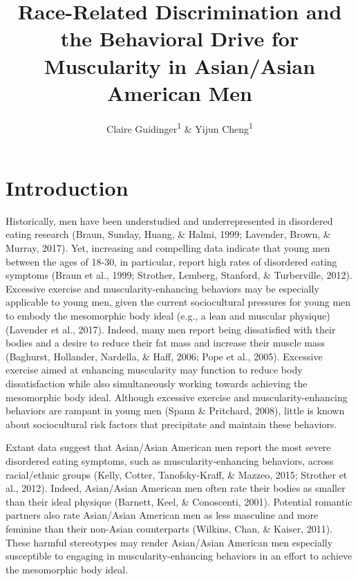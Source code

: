 \documentclass[
  english,
  man, fleqn, noextraspace,floatsintext]{apa6}
\title{Race-Related Discrimination and the Behavioral Drive for Muscularity in Asian/Asian American Men}
\author{Claire Guidinger\textsuperscript{1} \& Yijun Cheng\textsuperscript{1}}
\date{}
\affiliation{\vspace{0.5cm}\textsuperscript{1} University of Oregon}
\begin{document}
\maketitle

\hypertarget{introduction}{%
\section{Introduction}\label{introduction}}

Historically, men have been understudied and underrepresented in disordered eating research (Braun, Sunday, Huang, \& Halmi, 1999; Lavender, Brown, \& Murray, 2017). Yet, increasing and compelling data indicate that young men between the ages of 18-30, in particular, report high rates of disordered eating symptoms (Braun et al., 1999; Strother, Lemberg, Stanford, \& Turberville, 2012). Excessive exercise and muscularity-enhancing behaviors may be especially applicable to young men, given the current sociocultural pressures for young men to embody the mesomorphic body ideal (e.g., a lean and muscular physique) (Lavender et al., 2017). Indeed, many men report being dissatisfied with their bodies and a desire to reduce their fat mass and increase their muscle mass (Baghurst, Hollander, Nardella, \& Haff, 2006; Pope et al., 2005). Excessive exercise aimed at enhancing muscularity may function to reduce body dissatisfaction while also simultaneously working towards achieving the mesomorphic body ideal. Although excessive exercise and muscularity-enhancing behaviors are rampant in young men (Spann \& Pritchard, 2008), little is known about sociocultural risk factors that precipitate and maintain these behaviors.

Extant data suggest that Asian/Asian American men report the most severe disordered eating symptoms, such as muscularity-enhancing behaviors, across racial/ethnic groups (Kelly, Cotter, Tanofsky-Kraff, \& Mazzeo, 2015; Strother et al., 2012). Indeed, Asian/Asian American men often rate their bodies as smaller than their ideal physique (Barnett, Keel, \& Conoscenti, 2001). Potential romantic partners also rate Asian/Asian American men as less masculine and more feminine than their non-Asian counterparts (Wilkins, Chan, \& Kaiser, 2011). These harmful stereotypes may render Asian/Asian American men especially susceptible to engaging in muscularity-enhancing behaviors in an effort to achieve the mesomorphic body ideal.
\end{document}
